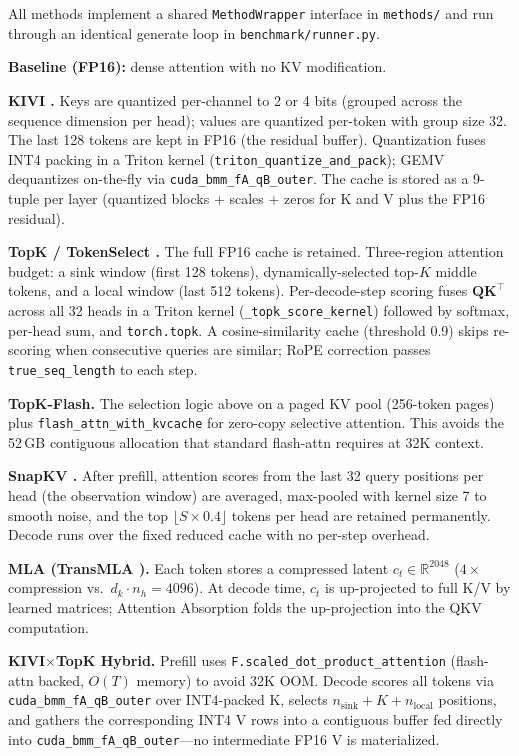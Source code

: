 \documentclass[conference]{IEEEtran}
\begin{document}
All methods implement a shared \texttt{MethodWrapper} interface in
\texttt{methods/} and run through an identical generate loop in
\texttt{benchmark/runner.py}.

\textbf{Baseline (FP16):} dense attention with no KV modification.

\textbf{KIVI \cite{kivi}.}  Keys are quantized per-channel to 2 or 4
bits (grouped across the sequence dimension per head); values are
quantized per-token with group size 32.  The last 128 tokens are kept
in FP16 (the residual buffer).  Quantization fuses INT4 packing in a
Triton kernel (\texttt{triton\_quantize\_and\_pack}); GEMV dequantizes
on-the-fly via \texttt{cuda\_bmm\_fA\_qB\_outer}.  The cache is stored
as a 9-tuple per layer (quantized blocks + scales + zeros for K and V
plus the FP16 residual).

\textbf{TopK / TokenSelect \cite{tokenselect}.}  The full FP16 cache is
retained.  Three-region attention budget: a sink window (first 128
tokens), dynamically-selected top-$K$ middle tokens, and a local window
(last 512 tokens).  Per-decode-step scoring fuses
$\mathbf{Q}\mathbf{K}^\top$ across all 32 heads in a Triton kernel
(\texttt{\_topk\_score\_kernel}) followed by softmax, per-head sum, and
\texttt{torch.topk}.  A cosine-similarity cache (threshold 0.9) skips
re-scoring when consecutive queries are similar; RoPE correction passes
\texttt{true\_seq\_length} to each step.

\textbf{TopK-Flash.}  The selection logic above on a paged KV pool
(256-token pages) plus \texttt{flash\_attn\_with\_kvcache} for
zero-copy selective attention.  This avoids the 52\,GB contiguous
allocation that standard flash-attn requires at 32K context.

\textbf{SnapKV \cite{snapkv}.}  After prefill, attention scores from
the last 32 query positions per head (the observation window) are
averaged, max-pooled with kernel size 7 to smooth noise, and the top
$\lfloor S \times 0.4 \rfloor$ tokens per head are retained
permanently.  Decode runs over the fixed reduced cache with no per-step
overhead.

\textbf{MLA (TransMLA \cite{transmla}).}  Each token stores a
compressed latent $c_t \in \mathbb{R}^{2048}$ ($4\times$ compression vs.\
$d_k\!\cdot\!n_h = 4096$).  At decode time, $c_t$ is up-projected to
full K/V by learned matrices; Attention Absorption folds the
up-projection into the QKV computation.

\textbf{KIVI$\times$TopK Hybrid.}  Prefill uses
\texttt{F.scaled\_dot\_product\_attention} (flash-attn backed,
$O(T)$ memory) to avoid 32K OOM.  Decode scores all tokens via
\texttt{cuda\_bmm\_fA\_qB\_outer} over INT4-packed K, selects
$n_\text{sink}+K+n_\text{local}$ positions, and gathers the
corresponding INT4 V rows into a contiguous buffer fed directly into
\texttt{cuda\_bmm\_fA\_qB\_outer}---no intermediate FP16 V is
materialized.
\end{document}

